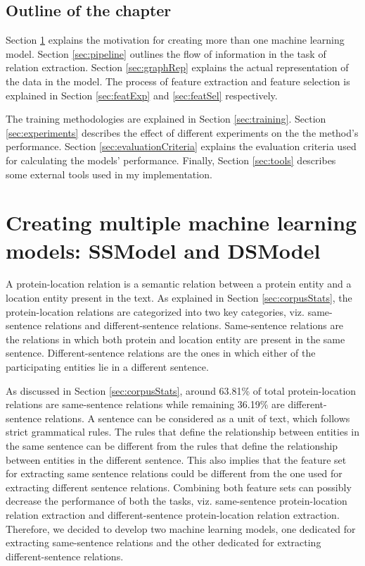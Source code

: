 \subsection*{Outline of the chapter}

Section \ref{sec:ssModeldsModel} explains the motivation for creating more than one machine learning model. Section \ref{sec:pipeline} outlines the flow of information in the task of relation extraction. Section \ref{sec:graphRep} explains the actual representation of the data in the model. The process of feature extraction and feature selection is explained in Section \ref{sec:featExp} and \ref{sec:featSel} respectively.

The training methodologies are explained in Section \ref{sec:training}. Section \ref{sec:experiments} describes the effect of different experiments on the the method's performance. Section \ref{sec:evaluationCriteria} explains the evaluation criteria used for calculating the models' performance. Finally, Section \ref{sec:tools} describes some external tools used in my implementation.

\section{Creating multiple machine learning models: SSModel and DSModel}\label{sec:ssModeldsModel}

A protein-location relation is a semantic relation between a protein entity and a location entity present in the text. As explained in Section \ref{sec:corpusStats}, the protein-location relations are categorized into two key categories, viz. same-sentence relations and different-sentence relations. Same-sentence relations are the relations in which both protein and location entity are present in the same sentence. Different-sentence relations are the ones in which either of the participating entities lie in a different sentence.

As discussed in Section \ref{sec:corpusStats}, around 63.81\% of total protein-location relations are same-sentence relations while remaining 36.19\% are different-sentence relations. A sentence can be considered as a unit of text, which follows strict grammatical rules. The rules that define the relationship between entities in the same sentence can be different from the rules that define the relationship between entities in the different sentence. This also implies that the feature set for extracting same sentence relations could be different from the one used for extracting different sentence relations. Combining both feature sets can possibly decrease the performance of both the tasks, viz. same-sentence protein-location relation extraction and different-sentence protein-location relation extraction. Therefore, we decided to develop two machine learning models, one dedicated for extracting same-sentence relations and the other dedicated for extracting different-sentence relations.


